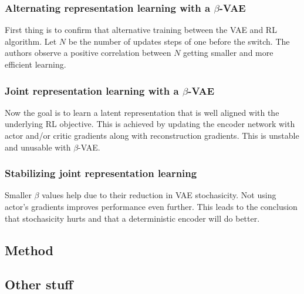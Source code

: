 \documentclass{article}
\begin{document}
\subsubsection{Alternating representation learning with a  $ \beta  $-VAE}
First thing is to confirm that alternative training between the VAE and RL algorithm.
Let $ N  $ be the number of updates steps of one before the switch.
The authors observe a positive correlation between $ N  $ getting smaller and more efficient learning.

\subsubsection{Joint representation learning with a $ \beta  $-VAE}
Now the goal is to learn a latent representation that is well aligned with the 
underlying RL objective.
This is achieved by updating the encoder network with actor and/or critic
gradients along with reconstruction gradients.
This is unstable and unusable with $ \beta  $-VAE.

\subsubsection{Stabilizing joint representation learning}
Smaller $ \beta  $ values help due to their reduction in VAE stochasicity.
Not using actor's gradients improves performance even further.
This leads to the conclusion that stochasicity hurts and that
a deterministic encoder will do better.



\subsection{Method}

\subsection{Other stuff}
\end{document}
